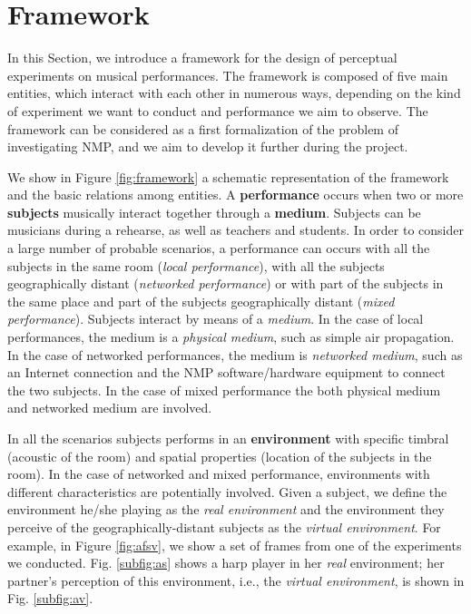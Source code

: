 \section{Framework}\label{sec:framework}
In this Section, we introduce a framework for the design of perceptual experiments on musical performances. The framework is composed of five main entities, which interact with each other in numerous ways, depending on the kind of experiment we want to conduct and performance we aim to observe. The framework can be considered as a first formalization of the problem of investigating NMP, and we aim to develop it further during the project.

We show in Figure \ref{fig:framework} a schematic representation of the framework and the basic relations among entities. A \textbf{performance} occurs when two or more \textbf{subjects} musically interact together through a \textbf{medium}. Subjects can be musicians during a rehearse, as well as teachers and students. In order to consider a large number of probable scenarios, a performance can occurs with all the subjects in the same room (\textit{local performance}), with all the subjects geographically distant (\textit{networked performance}) or with part of the subjects in the same place and part of the subjects geographically distant (\textit{mixed performance}). Subjects interact by means of a \textit{medium}. In the case of local performances, the medium is a \textit{physical medium}, such as simple air propagation. In the case of networked performances, the medium is \textit{networked medium}, such as an Internet connection and the NMP software/hardware equipment to connect the two subjects. In the case of mixed performance the both physical medium and networked medium are involved. 

In all the scenarios subjects performs in an \textbf{environment} with specific timbral (acoustic of the room) and spatial properties (location of the subjects in the room). In the case of networked and mixed performance, environments with different characteristics are potentially involved. Given a subject, we define the environment he/she playing as the \textit{real environment} and the environment they perceive of the geographically-distant subjects as the \textit{virtual environment}. For example, in Figure \ref{fig:afsv}, we show a set of frames from one of the experiments we conducted. Fig. \ref{subfig:as} shows a harp player in her \textit{real} environment; her partner's perception of this environment, i.e., the \textit{virtual environment}, is shown in Fig. \ref{subfig:av}. 

